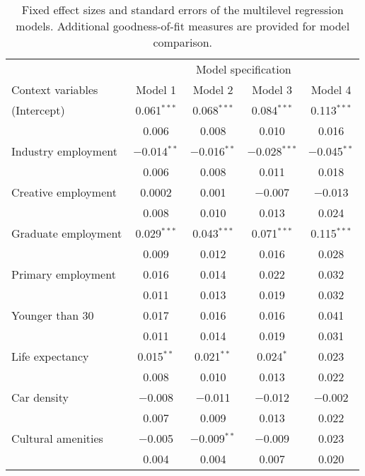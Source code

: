 \begin{table}

\caption[Fixed effects of the multilevel regression models]{Fixed effect sizes and standard errors of the multilevel regression models. Additional goodness-of-fit measures are provided for model comparison.}
\centering
\begin{tabular}[t]{lcccc}
\toprule
\multicolumn{1}{c}{ } & \multicolumn{4}{c}{Model specification} \\
\cmidrule(l{3pt}r{3pt}){2-5}
Context variables & Model 1 & Model 2 & Model 3 & Model 4\\
\midrule
(Intercept) & \num{0.061}$^{***}$ & \num{0.068}$^{***}$ & \num{0.084}$^{***}$ & \num{0.113}$^{***}$\\
 & \num{0.006} & \num{0.008} & \num{0.010} & \num{0.016}\\
Industry employment & \num{-0.014}$^{**}$ & \num{-0.016}$^{**}$ & \num{-0.028}$^{***}$ & \num{-0.045}$^{**}$\\
 & \num{0.006} & \num{0.008} & \num{0.011} & \num{0.018}\\
Creative employment & \num{0.0002} & \num{0.001} & \num{-0.007} & \num{-0.013}\\
 & \num{0.008} & \num{0.010} & \num{0.013} & \num{0.024}\\
Graduate employment & \num{0.029}$^{***}$ & \num{0.043}$^{***}$ & \num{0.071}$^{***}$ & \num{0.115}$^{***}$\\
 & \num{0.009} & \num{0.012} & \num{0.016} & \num{0.028}\\
Primary employment & \num{0.016} & \num{0.014} & \num{0.022} & \num{0.032}\\
 & \num{0.011} & \num{0.013} & \num{0.019} & \num{0.032}\\
Younger than 30 & \num{0.017} & \num{0.016} & \num{0.016} & \num{0.041}\\
 & \num{0.011} & \num{0.014} & \num{0.019} & \num{0.031}\\
Life expectancy & \num{0.015}$^{**}$ & \num{0.021}$^{**}$ & \num{0.024}$^{*}$ & \num{0.023}\\
 & \num{0.008} & \num{0.010} & \num{0.013} & \num{0.022}\\
Car density & \num{-0.008} & \num{-0.011} & \num{-0.012} & \num{-0.002}\\
 & \num{0.007} & \num{0.009} & \num{0.013} & \num{0.022}\\
Cultural amenities & \num{-0.005} & \num{-0.009}$^{**}$ & \num{-0.009} & \num{0.023}\\
 & \num{0.004} & \num{0.004} & \num{0.007} & \num{0.020}\\

\end{tabular}
\end{table}
